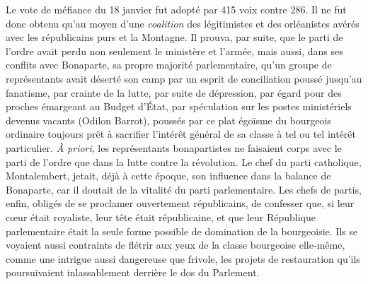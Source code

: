 \documentclass[french,twoside]{book} %
\begin{document}
Le vote de méfiance du 18 janvier fut adopté par 415 voix contre 286. Il ne fut donc obtenu qu’au moyen d’une \emph{coalition} des légitimistes et des orléanistes avérés avec les républicains purs et la Montagne. Il prouva, par suite, que le parti de l’ordre avait perdu non seulement le ministère et l’armée, mais aussi, dans ses conflits avec Bonaparte, sa propre majorité parlementaire, qu’un groupe de représentants avait déserté son camp par un esprit de conciliation poussé jusqu’au fanatisme, par crainte de la lutte, par suite de dépression, par égard pour des proches émargeant au Budget d’État, par spéculation sur les postes ministériels devenus vacants (Odilon Barrot), poussés par ce plat égoïsme du bourgeois ordinaire toujours prêt à sacrifier l’intérêt général de sa classe à tel ou tel intérêt particulier. \emph{À priori}, les représentants bonapartistes ne faisaient corps avec le parti de l’ordre que dans la lutte contre la révolution. Le chef du parti catholique, Montalembert, jetait, déjà à cette époque, son influence dans la balance de Bonaparte, car il doutait de la vitalité du parti parlementaire. Les chefs de partis, enfin, obligés de se proclamer ouvertement républicains, de confesser que, si leur cœur était royaliste, leur tête était républicaine, et que leur République parlementaire était la seule forme possible de domination de la bourgeoisie. Ils se voyaient aussi contraints de flétrir aux yeux de la classe bourgeoise elle-même, comme une intrigue aussi dangereuse que frivole, les projets de restauration qu’ils poursuivaient inlassablement derrière le dos du Parlement.\par
\end{document}
